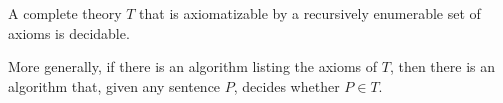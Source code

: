 A complete theory $T$ that is axiomatizable by a recursively enumerable set of axioms is decidable.

More generally, if there is an algorithm listing the axioms of $T$, then there is an algorithm that, given any sentence $P$, decides whether $P \in T$.
